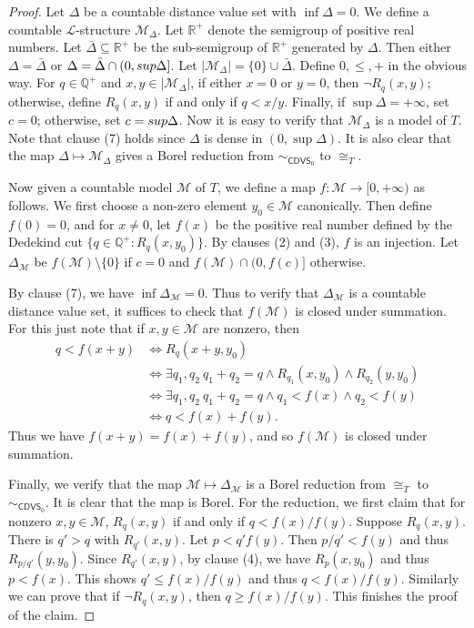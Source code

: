 \documentclass{amsart}
\theoremstyle{definition}
\theoremstyle{remark}
\begin{document}
\begin{proof}
Let $\Delta$ be a countable distance value set with $\inf\Delta=0$. We define a countable $\mathcal{L}$-structure $\mathcal{M}_\Delta$. Let $\mathbb{R}^+$ denote the semigroup of positive real numbers. Let $\bar{\Delta}\subseteq \mathbb{R}^+$ be the sub-semigroup of $\mathbb{R}^+$ generated by $\Delta$. Then either $\Delta = \bar{\Delta}$ or $\Delta = \bar{\Delta} \cap (0,{\rm sup}\Delta]$. 
Let $|\mathcal{M}_\Delta| = \{0\} \cup \bar{\Delta}$. Define $0, \leq, +$ in the obvious way. For $q \in \mathbb{Q}^+$ and $x,y \in |\mathcal{M}_\Delta|$, if  either $x=0$ or $y=0$, then $\lnot R_q(x,y)$; otherwise, define $R_q(x,y)$ if and only if $q < x/y$. Finally, if $\sup\Delta=+\infty$, set $c = 0$; otherwise, set $c = {\rm sup}\Delta$. Now it is easy to verify that $\mathcal{M}_\Delta$ is a model of $T$. Note that clause (7) holds since $\Delta$ is dense in $(0, \sup\Delta)$.  It is also clear that the map $\Delta \mapsto \mathcal{M}_\Delta$ gives a Borel reduction from $\sim_{\mathsf{CDVS}_0}$ to $\cong_T$.  

    Now given a countable model $\mathcal{M} $ of $T$, we define a map $f:\mathcal{M} \to [0,+\infty)$ as follows. We first choose a non-zero element $y_0\in \mathcal{M}$ canonically. Then define $f(0)=0$, and for $x\neq 0$, let $f(x)$ be the positive real number defined by the Dedekind cut $\{q\in \mathbb{Q}^+ \colon R_q(x,y_0)\}$. By clauses (2) and (3), $f$ is an injection. Let $\Delta_{\mathcal{M}}$ be $f(\mathcal{M}) \setminus \{0\}$ if $c=0$ and $f(\mathcal{M}) \cap (0,f(c)]$ otherwise. 

By clause (7), we have $\inf\Delta_{\mathcal{M}}=0$. Thus to verify that $\Delta_{\mathcal{M}}$ is a countable distance value set, it suffices to check that $f(\mathcal{M})$ is closed under summation. For this just note that if $x,y \in \mathcal{M}$ are nonzero, then
    \begin{align*}
        q<f(x+y)&\iff R_q(x+y, y_0) \\& \iff \exists q_1,q_2 \ q_1+q_2=q \land R_{q_1}(x, y_0)\land R_{q_2}(y, y_0) \\& \iff \exists q_1,q_2 \ q_1+q_2=q \land q_1< f(x)\land q_2<f(y) \\& \iff q <f(x)+f(y).
    \end{align*}
    Thus we have $f(x+y)=f(x)+f(y)$, and so $f(\mathcal{M})$ is closed under summation. 

 Finally, we verify that the map $\mathcal{M}\mapsto \Delta_{\mathcal{M}}$ is a Borel reduction from $\cong_T$ to $\sim_{\mathsf{CDVS}_0}$.  It is clear that the map is Borel. For the reduction, we first claim that for nonzero $x,y \in \mathcal{M}$, $R_q(x,y)$ if and only if $q<f(x)/f(y)$. Suppose $R_q(x,y)$. There is $q'>q$ with $R_{q'}(x,y)$.  Let $p<q'f(y)$. Then $p/q' <f(y)$ and thus $R_{p/q'}(y,y_0)$. Since $R_{q'}(x,y)$, by clause (4), we have $R_p(x,y_0)$ and thus $p<f(x)$. This shows $q'\leq f(x)/f(y)$ and thus $q <f(x)/f(y)$. Similarly we can prove that if $\lnot R_q(x,y)$, then $q \geq f(x)/f(y)$. This finishes the proof of the claim. 


\end{proof}
\end{document}
